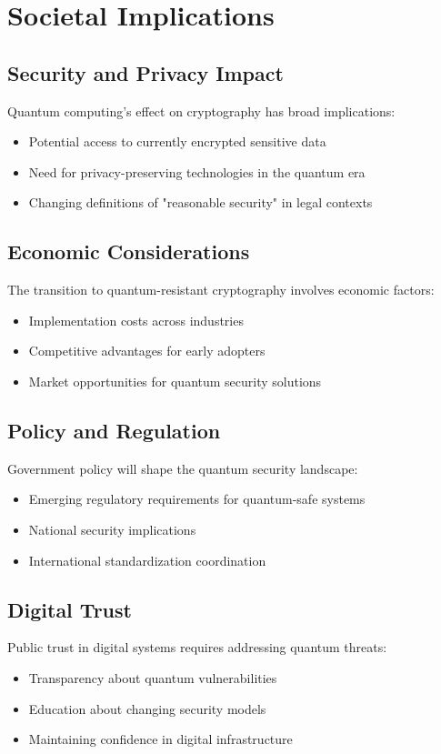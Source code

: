 \chapter{Societal Implications}
\label{chap:societal-implications}

\section{Security and Privacy Impact}
Quantum computing's effect on cryptography has broad implications:
\begin{itemize}
    \item Potential access to currently encrypted sensitive data
    \item Need for privacy-preserving technologies in the quantum era
    \item Changing definitions of "reasonable security" in legal contexts
\end{itemize}

\section{Economic Considerations}
The transition to quantum-resistant cryptography involves economic factors:
\begin{itemize}
    \item Implementation costs across industries
    \item Competitive advantages for early adopters
    \item Market opportunities for quantum security solutions
\end{itemize}

\section{Policy and Regulation}
Government policy will shape the quantum security landscape:
\begin{itemize}
    \item Emerging regulatory requirements for quantum-safe systems
    \item National security implications
    \item International standardization coordination
\end{itemize}

\section{Digital Trust}
Public trust in digital systems requires addressing quantum threats:
\begin{itemize}
    \item Transparency about quantum vulnerabilities
    \item Education about changing security models
    \item Maintaining confidence in digital infrastructure
\end{itemize}

